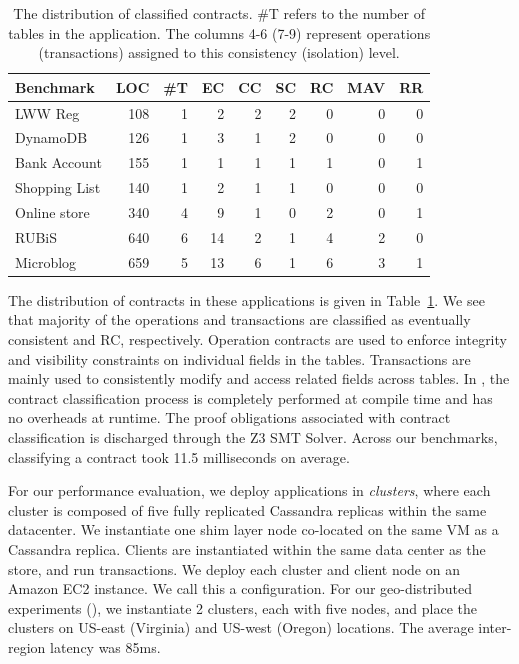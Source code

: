 \begin{table}
\setlength{\tabcolsep}{4pt}
{\sffamily \small
\begin{center}
\begin{tabular} {|l|r|r|r|r|r|r|r|r|}
\hline
{\bf Benchmark} & {\bf LOC} & {\bf \#T} & {\bf EC} & {\bf CC} & {\bf SC} & {\bf RC} & {\bf MAV} & {\bf RR} \\
\hline
{LWW Reg} & 108 & 1 & 2 & 2 & 2 & 0 & 0 & 0 \\
{DynamoDB} & 126 & 1 & 3 & 1 & 2 & 0 & 0 & 0 \\
{Bank Account} & 155 & 1 & 1 & 1 & 1 & 1 & 0 & 1 \\
{Shopping List} & 140 & 1 & 2 & 1 & 1 & 0 & 0 & 0 \\
{Online store} & 340 & 4 & 9 & 1 & 0 & 2 & 0 & 1 \\
{RUBiS} & 640 & 6 & 14 & 2 & 1 & 4 & 2 & 0 \\
{Microblog} & 659 & 5 & 13 & 6 & 1 & 6 & 3 & 1 \\
\hline
\end{tabular}
\end{center} }
\caption{The distribution of classified contracts. \#T refers to the number of
tables in the application. The columns 4-6 (7-9) represent operations
(transactions) assigned to this consistency (isolation) level.}
\label{tab:ctrts}
\end{table}

The distribution of contracts in these applications is given in
Table~\ref{tab:ctrts}. We see that majority of the operations and transactions
are classified as eventually consistent and RC, respectively. Operation
contracts are used to enforce integrity and visibility constraints on
individual fields in the tables. Transactions are mainly used to consistently
modify and access related fields across tables. In \name, the contract
classification process is completely performed at compile time and has no
overheads at runtime. The proof obligations associated with contract
classification is discharged through the Z3 SMT Solver. Across our benchmarks,
classifying a contract took 11.5 milliseconds on average.

For our performance evaluation, we deploy \name applications in
\emph{clusters}, where each cluster is composed of five fully replicated
Cassandra replicas within the same datacenter. We instantiate one shim layer
node co-located on the same VM as a Cassandra replica. Clients are instantiated
within the same data center as the store, and run transactions. We deploy each
cluster and client node on an  Amazon EC2 instance. We call this
a  configuration. For our geo-distributed experiments (), we
instantiate 2 clusters, each with five nodes, and place the clusters on US-east
(Virginia) and US-west (Oregon) locations. The average inter-region latency was
85ms.

